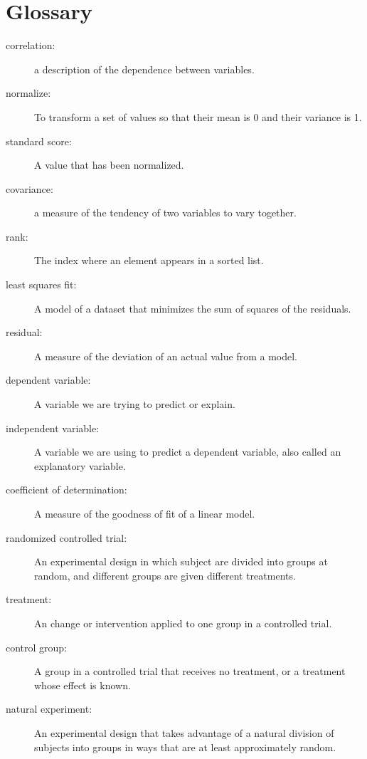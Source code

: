 \documentclass[12pt]{book}
\begin{document}
\section{Glossary}

\begin{description}

\item[correlation:] a description of the dependence between variables.

\item[normalize:] To transform a set of values so that their mean is 0 and
their variance is 1.

\item[standard score:] A value that has been normalized.

\item[covariance:] a measure of the tendency of two variables
to vary together.

\item[rank:] The index where an element appears in a sorted list.

\item[least squares fit:] A model of a dataset that minimizes the
sum of squares of the residuals.

\item[residual:] A measure of the deviation of an actual value from a model.

\item[dependent variable:] A variable we are trying to predict or explain.

\item[independent variable:] A variable we are using to predict a dependent
variable, also called an explanatory variable.

\item[coefficient of determination:] A measure of the goodness of fit
of a linear model.

\item[randomized controlled trial:] An experimental design in which subject
are divided into groups at random, and different groups are given different
treatments.

\item[treatment:] An change or intervention applied to one group in a
controlled trial.

\item[control group:] A group in a controlled trial that receives no
treatment, or a treatment whose effect is known.

\item[natural experiment:] An experimental design that takes advantage of
a natural division of subjects into groups in ways that are at least
approximately random.

\end{description}


\printindex

\clearemptydoublepage
\end{document}
